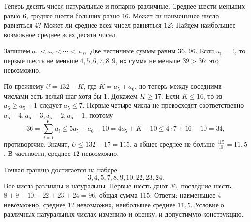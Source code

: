 \begin{example}\label{ex:review-ege-targeted-distinct-overlap}
Теперь десять чисел натуральные и попарно различные. Среднее шести меньших равно \(6\), среднее шести больших равно \(16\). Может ли наименьшее число равняться \(4\)? Может ли среднее всех чисел равняться \(12\)? Найдём наибольшее возможное среднее всех десяти чисел.

Запишем \(a_1<a_2<\cdots<a_{10}\). Две частичные суммы равны \(36\), \(96\). Если \(a_1=4\), то первые шесть не меньше \(4,5,6,7,8,9\), их сумма не меньше \(39>36\): это невозможно.

По-прежнему \(U=132-K\), где \(K=a_5+a_6\), но теперь между соседними числами есть целый шаг хотя бы \(1\). Докажем \(K\ge17\). Если \(K\le16\), то из \(a_6\ge a_5+1\) следует \(a_5\le7\). Первые четыре числа не превосходят соответственно \(a_5-4,a_5-3,a_5-2,a_5-1\), поэтому
\[
36=\sum_{i=1}^6a_i
\le5a_5+a_6-10
=4a_5+K-10
\le4\cdot7+16-10=34,
\]
противоречие. Значит, \(U\le132-17=115\), а общее среднее не больше \(\frac{115}{10}=11{,}5\). В частности, среднее \(12\) невозможно.

Точная граница достигается на наборе
\[
3,4,5,7,8,9,10,22,23,24.
\]
Все числа различны и натуральны. Первые шесть дают \(36\), последние шесть --- \(8+9+10+22+23+24=96\), общая сумма \(115\). Ответы: наименьшее \(4\) невозможно; среднее \(12\) невозможно; наибольшее среднее \(11{,}5\). Условие о различных натуральных числах изменило и оценку, и допустимую конструкцию.
\end{example}

